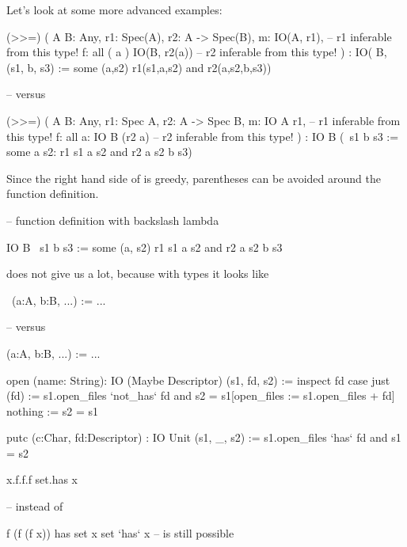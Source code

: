 Let's look at some more advanced examples:
%
\begin{alba}
  (>>=) ( A B: Any, r1: Spec(A), r2: A -> Spec(B),
          m: IO(A, r1),       -- r1 inferable from this type!
          f: all ( a )
               IO(B, r2(a))   -- r2 inferable from this type!
        )
        : IO( B,
              (s1, b, s3) :=
                  some (a,s2)
                    r1(s1,a,s2) and
                    r2(a,s2,b,s3))

  -- versus

  (>>=) ( A B: Any, r1: Spec A, r2: A -> Spec B,
          m: IO A r1,         -- r1 inferable from this type!
          f: all a:
               IO B (r2 a)    -- r2 inferable from this type!
        )
        : IO  B
              (\ s1 b s3 :=
                  some a s2:
                    r1 s1 a s2 and
                    r2 a s2 b s3)

\end{alba}
%
Since the right hand side of \code{:=} is greedy, parentheses can be avoided
around the function definition.
%
\begin{alba}
  -- function definition with backslash lambda

          IO  B
              \ s1 b s3 :=
                  some (a, s2)
                    r1 s1 a s2 and
                    r2 a s2 b s3
\end{alba}
%
does not give us a lot, because with types it looks like
%
\begin{alba}
  \ (a:A, b:B, ...) :=
        ...

  -- versus

  (a:A, b:B, ...) :=
        ...
\end{alba}


\begin{alba}
  open (name: String):
       IO (Maybe Descriptor)
          (s1, fd, s2) :=
             inspect fd case
                just (fd) :=
                   s1.open_files `not_has` fd
                   and
                   s2 = s1[open_files := s1.open_files + fd]
                nothing :=
                   s2 = s1

  putc (c:Char, fd:Descriptor)
       : IO Unit
            (s1, _, s2) :=
                s1.open_files `has` fd and
                s1 = s2
\end{alba}


\begin{alba}
  x.f.f.f                  set.has x

  -- instead of

  f (f (f x))              has set x
                           set `has` x
  -- is still possible
\end{alba}




